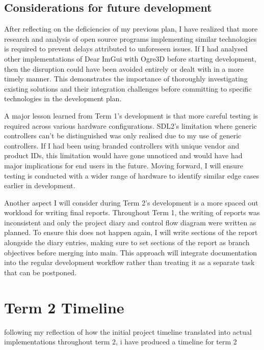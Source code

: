 \documentclass{article}
\begin{document}
\subsection{Considerations for future development}
After reflecting on the deficiencies of my previous plan, I have realized that more research and analysis of open source programs implementing similar technologies is required to prevent delays attributed to unforeseen issues. If I had analysed other implementations of Dear ImGui with Ogre3D before starting development, then the disruption could have been avoided entirely or dealt with in a more timely manner. This demonstrates the importance of thoroughly investigating existing solutions and their integration challenges before committing to specific technologies in the development plan. \newline

A major lesson learned from Term 1's development is that more careful testing is required across various hardware configurations. SDL2's limitation where generic controllers can't be distinguished was only realised due to my use of generic controllers. If I had been using branded controllers with unique vendor and product IDs, this limitation would have gone unnoticed and would have had major implications for end users in the future. Moving forward, I will ensure testing is conducted with a wider range of hardware to identify similar edge cases earlier in development. \newline

Another aspect I will consider during Term 2's development is a more spaced out workload for writing final reports. Throughout Term 1, the writing of reports was inconsistent and only the project diary and control flow diagram were written as planned. To ensure this does not happen again, I will write sections of the report alongside the diary entries, making sure to set sections of the report as branch objectives before merging into main. This approach will integrate documentation into the regular development workflow rather than treating it as a separate task that can be postponed. \newline

 


\newpage
\section{Term 2 Timeline}

following my reflection of how the initial project timeline translated into actual implementations throughout term 2, i have produced a timeline for term 2   
\end{document}
